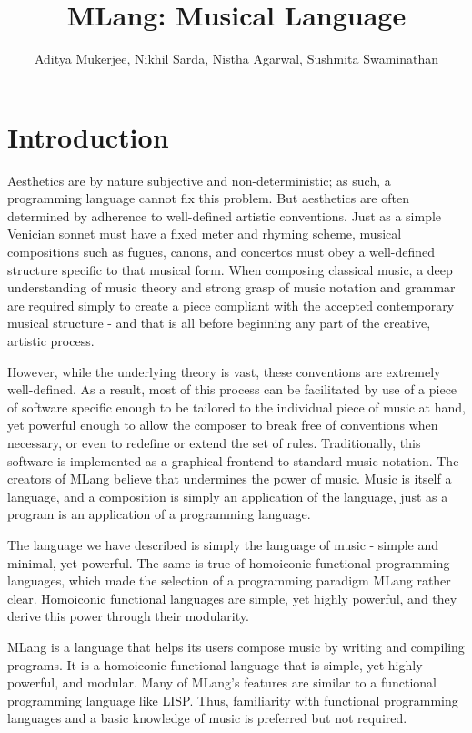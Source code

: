 \documentclass[letterpaper,11pt]{article}
\begin{document}
\title{MLang: Musical Language}
\author{Aditya Mukerjee, Nikhil Sarda, Nistha Agarwal, Sushmita Swaminathan}
\maketitle

\section{Introduction}

Aesthetics are by nature subjective and non-deterministic; as such, a programming language cannot fix this problem. But aesthetics are often determined by adherence to well-defined artistic conventions. Just as a simple Venician sonnet must have a fixed meter and rhyming scheme, musical compositions such as fugues, canons, and concertos must obey a well-defined structure specific to that musical form. When composing classical music, a deep understanding of music theory and strong grasp of music notation and grammar are required simply to create a piece compliant with the accepted contemporary musical structure - and that is all before beginning any part of the creative, artistic process. 

However, while the underlying theory is vast, these conventions are extremely well-defined. As a result, most of this process can be facilitated by use of a piece of software specific enough to be tailored to the individual piece of music at hand, yet powerful enough to allow the composer to break free of conventions when necessary, or even to redefine or extend the set of rules. Traditionally, this software is implemented as a graphical frontend to standard music notation. The creators of MLang believe that undermines the power of music. Music is itself a language, and a composition is simply an application of the language, just as a program is an application of a programming language.

The language we have described is simply the language of music - simple and minimal, yet powerful. The same is true of homoiconic functional programming languages, which made the selection of a programming paradigm MLang rather clear. Homoiconic functional languages are simple, yet highly powerful, and they derive this power through their modularity.

MLang is a language that helps its users compose music by writing and compiling programs. It is a homoiconic functional language that is simple,
yet highly powerful, and modular. Many of MLang's features are similar to a functional programming language like LISP. 
Thus, familiarity with functional programming languages and a basic knowledge of music is preferred but not required.
\end{document}
